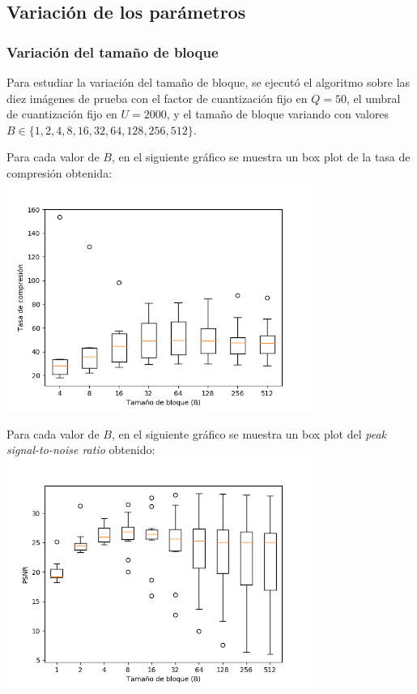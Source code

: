 \documentclass{article}
\newcommand{\set}[1]{\{#1\}}
\begin{document}
\subsection{Variación de los parámetros}

\subsubsection{Variación del tamaño de bloque}
\label{sec:variacion_tam_bloque}

Para estudiar la variación del tamaño de bloque, se ejecutó el
algoritmo sobre las diez imágenes de prueba con el
factor de cuantización fijo en $Q = 50$,
el umbral de cuantización fijo en $U = 2000$,
y el tamaño de bloque variando con valores
$B \in \set{1,2,4,8,16,32,64,128,256,512}$.

Para cada valor de $B$, en el siguiente gráfico se muestra un
box plot de la tasa de compresión obtenida:\\
\includegraphics[width=10cm]{../imgs/output/gray_plots/b_rate.png}

Para cada valor de $B$, en el siguiente gráfico se muestra un
box plot del {\em peak signal-to-noise ratio} obtenido:\\
\includegraphics[width=10cm]{../imgs/output/gray_plots/b_psnr.png}
\end{document}
